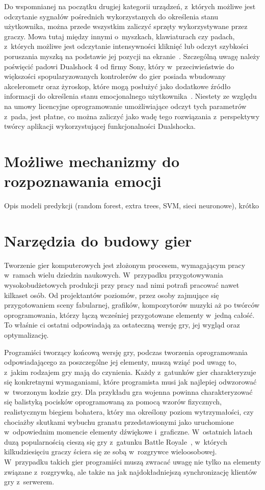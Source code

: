 Do wspomnianej na początku drugiej kategorii urządzeń, z~których możliwe jest odczytanie sygnałów pośrednich wykorzystanych do określenia stanu użytkownika, można przede wszystkim zaliczyć sprzęty wykorzystywane przez graczy. Mowa tutaj między innymi o~myszkach, klawiaturach czy padach, z~których możliwe jest odczytanie intensywności kliknięć lub odczyt szybkości poruszania myszką na podstawie jej pozycji na ekranie~\cite{measuring_emotion_from_gamepad}. Szczególną uwagę należy poświęcić padowi Dualshock 4 od firmy Sony, który w~przeciwieństwie do większości spopularyzowanych kontrolerów do gier posiada wbudowany akcelerometr oraz żyroskop, które mogą posłużyć jako dodatkowe źródło informacji do określenia stanu emocjonalnego użytkownika~\cite{dualshock_specification}. Niestety ze względu na umowy licencyjne oprogramowanie umożliwiające odczyt tych parametrów z~pada, jest płatne, co można zaliczyć jako wadę tego rozwiązania z~perspektywy twórcy aplikacji wykorzystującej funkcjonalności Dualshocka.

\section{Możliwe mechanizmy do rozpoznawania emocji}
Opis modeli predykcji (random forest, extra trees, SVM, sieci neuronowe), krótko
\section{Narzędzia do budowy gier}
Tworzenie gier komputerowych jest złożonym procesem, wymagającym pracy w~ramach wielu dziedzin naukowych. W~przypadku przygotowywania wysokobudżetowych produkcji przy pracy nad nimi potrafi pracować nawet kilkaset osób. Od projektantów poziomów, przez osoby zajmujące się przygotowaniem sceny fabularnej, grafików, kompozytorów muzyki aż po twórców oprogramowania, którzy łączą wcześniej przygotowane elementy w~jedną całość. To właśnie ci ostatni odpowiadają za ostateczną wersję gry, jej wygląd oraz optymalizację. 

Programiści tworzący końcową wersję gry, podczas tworzenia oprogramowania odpowiadającego za poszczególne jej elementy, muszą wziąć pod uwagę to, z~jakim rodzajem gry mają do czynienia. Każdy z~gatunków gier charakteryzuje się konkretnymi wymaganiami, które programista musi jak najlepiej odwzorować w~tworzonym kodzie gry. Dla przykładu gra wojenna powinna charakteryzować się balistyką pocisków oprogramowaną za pomocą wzorów fizycznych, realistycznym biegiem bohatera, który ma określony poziom wytrzymałości, czy chociażby skutkami wybuchu granatu przedstawionymi jako uruchomione w~odpowiednim momencie elementy dźwiękowe i~graficzne. W~ostatnich latach duzą popularnością cieszą się gry z~gatunku Battle Royale~\cite{network_traffic_moll}, w~których kilkudziesięciu graczy ściera się ze sobą w~rozgrywce wieloosobowej. W~przypadku takich gier programiści muszą zwracać uwagę nie tylko na elementy związane z~rozgrywką, ale także na jak najdokładniejszą synchronizację klientów gry z~serwerem.

